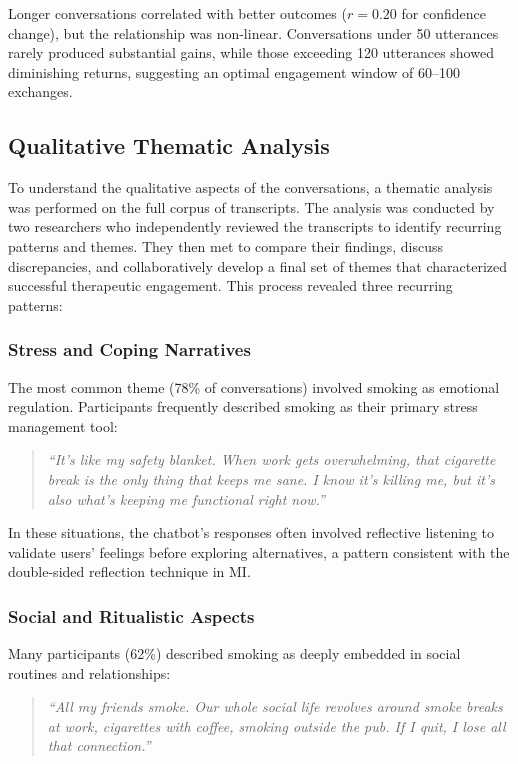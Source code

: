 Longer conversations correlated with better outcomes ($r=0.20$ for confidence change), but the relationship was non-linear. Conversations under 50 utterances rarely produced substantial gains, while those exceeding 120 utterances showed diminishing returns, suggesting an optimal engagement window of 60--100 exchanges.

\subsection*{Qualitative Thematic Analysis}

To understand the qualitative aspects of the conversations, a thematic analysis was performed on the full corpus of transcripts. The analysis was conducted by two researchers who independently reviewed the transcripts to identify recurring patterns and themes. They then met to compare their findings, discuss discrepancies, and collaboratively develop a final set of themes that characterized successful therapeutic engagement. This process revealed three recurring patterns:

\subsubsection*{Stress and Coping Narratives}

The most common theme (78\% of conversations) involved smoking as emotional regulation. Participants frequently described smoking as their primary stress management tool:

\begin{quote}
	\textit{``It's like my safety blanket. When work gets overwhelming, that cigarette break is the only thing that keeps me sane. I know it's killing me, but it's also what's keeping me functional right now.''}
\end{quote}

In these situations, the chatbot's responses often involved reflective listening to validate users' feelings before exploring alternatives, a pattern consistent with the double-sided reflection technique in MI.

\subsubsection*{Social and Ritualistic Aspects}

Many participants (62\%) described smoking as deeply embedded in social routines and relationships:

\begin{quote}
	\textit{``All my friends smoke. Our whole social life revolves around smoke breaks at work, cigarettes with coffee, smoking outside the pub. If I quit, I lose all that connection.''}
\end{quote}

